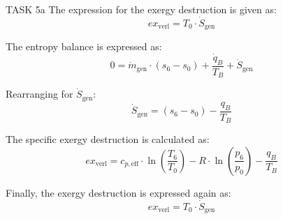 TASK 5a  
The expression for the exergy destruction is given as:  
\[
ex_{\text{verl}} = T_0 \cdot \dot{S}_{\text{gen}}
\]

The entropy balance is expressed as:  
\[
0 = \dot{m}_{\text{gen}} \cdot (s_6 - s_0) + \frac{\dot{q}_B}{T_B} + \dot{S}_{\text{gen}}
\]

Rearranging for \(\dot{S}_{\text{gen}}\):  
\[
\dot{S}_{\text{gen}} = (s_6 - s_0) - \frac{q_B}{T_B}
\]

The specific exergy destruction is calculated as:  
\[
ex_{\text{verl}} = c_{p,\text{eff}} \cdot \ln\left(\frac{T_6}{T_0}\right) - R \cdot \ln\left(\frac{p_6}{p_0}\right) - \frac{q_B}{T_B}
\]

Finally, the exergy destruction is expressed again as:  
\[
ex_{\text{verl}} = T_0 \cdot \dot{S}_{\text{gen}}
\]